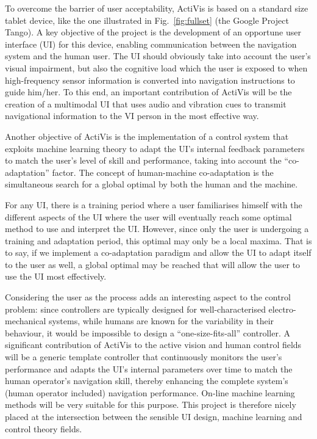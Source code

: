 \documentclass[letterpaper]{article}
\begin{document}
To overcome the barrier of user acceptability, ActiVis is based on a standard size tablet device, like the one illustrated in Fig.~\ref{fig:fullset} (the Google Project Tango). A key objective of the project is the development of an opportune user interface (UI) for this device, enabling communication between the navigation system and the human user. The UI should obviously take into account the user's visual impairment, but also the cognitive load which the user is exposed to when high-frequency sensor information is converted into navigation instructions to guide him/her. To this end, an important contribution of ActiVis will be the creation of a multimodal UI that uses audio and vibration cues to transmit navigational information to the VI person in the most effective way.    

Another objective of ActiVis is the implementation of a control system that exploits machine learning theory to adapt the UI's internal feedback parameters to match the user's level of skill and performance, taking into account the ``co-adaptation'' factor. The concept of human-machine co-adaptation is the simultaneous search for a global optimal by both the human and the machine. 

For any UI, there is a training period where a user familiarises himself with the different aspects of the UI where the user will eventually reach some optimal method to use and interpret the UI. However, since only the user is undergoing a training and adaptation period, this optimal may only be a local maxima. That is to say, if we implement a co-adaptation paradigm and allow the UI to adapt itself to the user as well, a global optimal may be reached that will allow the user to use the UI most effectively. 

Considering the user as the process adds an interesting aspect to the control problem: since controllers are typically designed for well-characterised electro-mechanical systems, while humans are known for the variability in their behaviour, it would be impossible to design a ``one-size-fits-all'' controller. A significant contribution of ActiVis to the active vision and human control fields will be a generic template controller that continuously monitors the user's performance and adapts the UI's internal parameters over time to match the human operator's navigation skill, thereby enhancing the complete system's (human operator included) navigation performance. On-line machine learning methods will be very suitable for this purpose. This project is therefore nicely placed at the intersection between the sensible UI design, machine learning and control theory fields. 
\end{document}
